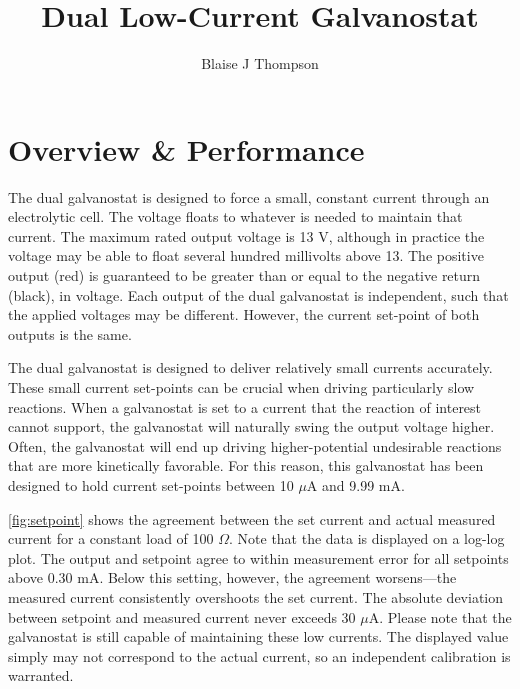 \documentclass{manual}
\title{Dual Low-Current Galvanostat}
\author{Blaise J Thompson}
\begin{document}
\maketitle


\section{Overview \& Performance}

The dual galvanostat is designed to force a small, constant current through an electrolytic cell.
The voltage floats to whatever is needed to maintain that current.
The maximum rated output voltage is 13 V, although in practice the voltage may be able to float several hundred millivolts above 13.
The positive output (red) is guaranteed to be greater than or equal to the negative return (black), in voltage.
Each output of the dual galvanostat is independent, such that the applied voltages may be different.
However, the current set-point of both outputs is the same.

The dual galvanostat is designed to deliver relatively small currents accurately.
These small current set-points can be crucial when driving particularly slow reactions.
When a galvanostat is set to a current that the reaction of interest cannot support, the galvanostat will naturally swing the output voltage higher.
Often, the galvanostat will end up driving higher-potential undesirable reactions that are more kinetically favorable.
For this reason, this galvanostat has been designed to hold current set-points between 10 $\mu$A and 9.99 mA.

\autoref{fig:setpoint} shows the agreement between the set current and actual measured current for a constant load of 100 $\Omega$.
Note that the data is displayed on a log-log plot.
The output and setpoint agree to within measurement error for all setpoints above 0.30 mA.
Below this setting, however, the agreement worsens---the measured current consistently overshoots the set current.
The absolute deviation between setpoint and measured current never exceeds 30 $\mu$A.
Please note that the galvanostat is still capable of maintaining these low currents.
The displayed value simply may not correspond to the actual current, so an independent calibration is warranted.
\end{document}
